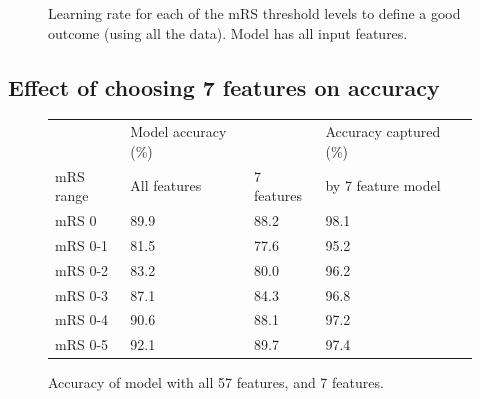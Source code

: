 \begin{figure}[!ht]
\centering
\hfil

\hfil

\hfil
    \label{fig:learning_rate}
  \caption{Learning rate for each of the mRS threshold levels to define a good outcome (using all the data). Model has all input features.}

\end{figure}
\fi


\subsection{Effect of choosing 7 features on accuracy}


\begin{figure}[!ht]
    \centering
        \begin{tabular}{lllll}
        \toprule
         & Model accuracy (\%) & &Accuracy captured (\%)\\ 
         mRS range & All features & 7 features & by 7 feature model\\ 
         \midrule
        mRS 0 & 89.9  & 88.2 & 98.1\\
        mRS 0-1 & 81.5  & 77.6 & 95.2\\
        mRS 0-2 & 83.2  & 80.0 & 96.2\\
        mRS 0-3 & 87.1  & 84.3 & 96.8\\
        mRS 0-4 & 90.6  & 88.1 & 97.2\\
        mRS 0-5 & 92.1  & 89.7 & 97.4\\
        \bottomrule
        \end{tabular}
      \caption{Accuracy of model with all 57 features, and 7 features.}
      \label{fig:table_accuracy_feature_selection}

\end{figure}

